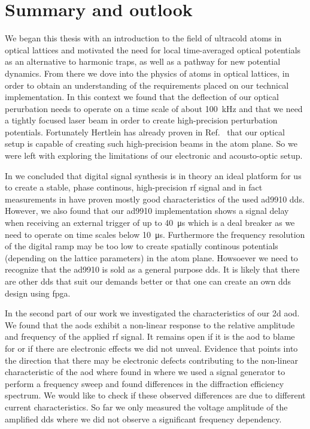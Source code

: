 \chapter{Summary and outlook}

We began this thesis with an introduction to the field of ultracold atoms
in optical lattices and motivated the need for local time-averaged optical
potentials as an alternative to harmonic traps, as well as a pathway for new
potential dynamics. From there we dove into the physics of atoms in optical
lattices, in order to obtain an understanding of the requirements placed on
our technical implementation. In this context we found that the deflection of
our optical perurbation needs to operate on a time scale of about
\SI{100}{\kilo\hertz} and that we need a tightly focused laser beam in order
to create high-precision perturbation potentials. Fortunately
Hertlein has already proven in Ref.~\cite{Hertlein2017} that our optical setup
is capable of creating such high-precision beams in the atom plane. So we were
left with exploring the limitations of our electronic and acousto-optic setup.

In  we concluded that digital signal
synthesis is in theory an ideal platform for us to create a stable, phase
continous, high-precision \gls{rf} signal and in fact measurements in
 have proven mostly good characteristics of the
used \gls{ad9910} \gls{dds}. However, we also found that our \gls{ad9910}
implementation shows a signal delay when receiving an external trigger of up
to \SI{40}{\micro\second} which is a deal breaker as we need to operate on
time scales below \SI{10}{\micro\second}. Furthermore the frequency resolution
of the digital ramp may be too low to create spatially continous potentials
(depending on the lattice parameters) in the atom plane. Howsoever we need to
recognize that the \gls{ad9910} is sold as a general purpose \gls{dds}. It is
likely that there are other \gls{dds} that suit our demands better or that one
can create an own \gls{dds} design using \gls{fpga}.

In the second part of our work we investigated the characteristics of our
\gls{2d} \gls{aod}. We found that the \gls{aod}s exhibit a non-linear response
to the relative amplitude and frequency of the applied \gls{rf} signal. It
remains open if it is the \gls{aod} to blame for or if there are electronic
effects we did not unveal. Evidence that points into the direction that
there may be electronic defects contributing to the non-linear characteristic
of the \gls{aod} where found in  where
we used a signal generator to perform a frequency sweep and found differences
in the diffraction efficiency spectrum. We would like to check if these
observed differences are due to different current characteristics. So far we
only measured the voltage amplitude of the amplified \gls{dds} where we did
not observe a significant frequency dependency.

